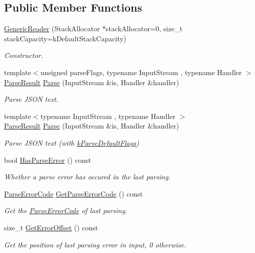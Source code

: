 \subsection*{Public Member Functions}
\begin{DoxyCompactItemize}
\item 
\hyperlink{classGenericReader_aab875a34b3092df9fb4e2b8eac6dbb96}{Generic\+Reader} (Stack\+Allocator $\ast$stack\+Allocator=0, size\+\_\+t stack\+Capacity=k\+Default\+Stack\+Capacity)
\begin{DoxyCompactList}\small\item\em Constructor. \end{DoxyCompactList}\item 
{\footnotesize template$<$unsigned parse\+Flags, typename Input\+Stream , typename Handler $>$ }\\\hyperlink{structParseResult}{Parse\+Result} \hyperlink{classGenericReader_a0c450620d14ff1824e58bb7bd9b42099}{Parse} (Input\+Stream \&is, Handler \&handler)
\begin{DoxyCompactList}\small\item\em Parse J\+S\+ON text. \end{DoxyCompactList}\item 
{\footnotesize template$<$typename Input\+Stream , typename Handler $>$ }\\\hyperlink{structParseResult}{Parse\+Result} \hyperlink{classGenericReader_a76d91e5fd8dfe48aea7dd6d8a51dd6dc}{Parse} (Input\+Stream \&is, Handler \&handler)
\begin{DoxyCompactList}\small\item\em Parse J\+S\+ON text (with \hyperlink{reader_8h_ab7be7dabe6ffcba60fad441505583450a9104b0946d648e9467cb7a967401ec80}{k\+Parse\+Default\+Flags}) \end{DoxyCompactList}\item 
bool \hyperlink{classGenericReader_aa9d10652062557ebf26cf414bfeabf84}{Has\+Parse\+Error} () const 
\begin{DoxyCompactList}\small\item\em Whether a parse error has occured in the last parsing. \end{DoxyCompactList}\item 
\hyperlink{group__RAPIDJSON__ERRORS_ga8d4b32dfc45840bca189ade2bbcb6ba7}{Parse\+Error\+Code} \hyperlink{classGenericReader_ac45a26246877c4daa85021ae67caa017}{Get\+Parse\+Error\+Code} () const 
\begin{DoxyCompactList}\small\item\em Get the \hyperlink{group__RAPIDJSON__ERRORS_ga8d4b32dfc45840bca189ade2bbcb6ba7}{Parse\+Error\+Code} of last parsing. \end{DoxyCompactList}\item 
size\+\_\+t \hyperlink{classGenericReader_a77399ac40cca1fb113a2d507f476b4e7}{Get\+Error\+Offset} () const 
\begin{DoxyCompactList}\small\item\em Get the position of last parsing error in input, 0 otherwise. \end{DoxyCompactList}\end{DoxyCompactItemize}

